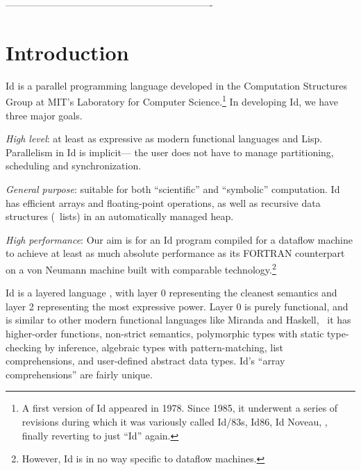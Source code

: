 






 \begin{figure}[htbp]
 \end{figure}



----------------------------------------------------------------



\section{Introduction}

Id is a parallel programming language developed in the Computation
Structures Group at MIT's Laboratory for Computer Science.\footnote{A
first version of Id appeared in 1978.  Since 1985, it underwent a
series of revisions during which it was variously called Id/83s, Id86,
Id Noveau, \etc, finally reverting to just ``Id'' again.

 } In developing Id, we have three major goals.

{\em High level\/}: at least as expressive as modern functional
languages and Lisp.  Parallelism in Id is implicit--- the user does
not have to manage partitioning, scheduling and synchronization.

{\em General purpose\/}: suitable for both ``scientific'' and
``symbolic'' computation.  Id has efficient arrays and floating-point
operations, as well as recursive data structures (\eg\ lists) in an
automatically managed heap.

{\em High performance\/}: Our aim is for an Id program compiled for a
dataflow machine to achieve at least as much absolute performance as
its FORTRAN counterpart on a von Neumann machine built with comparable
technology.\footnote{However, Id is in no way specific to dataflow
machines.}

Id is a layered language \cite{Nikhil88c,Nikhil90a}, with layer 0
representing the cleanest semantics and layer 2 representing the most
expressive power.  Layer 0 is purely functional, and is similar to
other modern functional languages like Miranda and Haskell, \ie\ it
has higher-order functions, non-strict semantics, polymorphic types
with static type-checking by inference, algebraic types with
pattern-matching, list comprehensions, and user-defined abstract data
types.  Id's ``array comprehensions'' are fairly unique.

